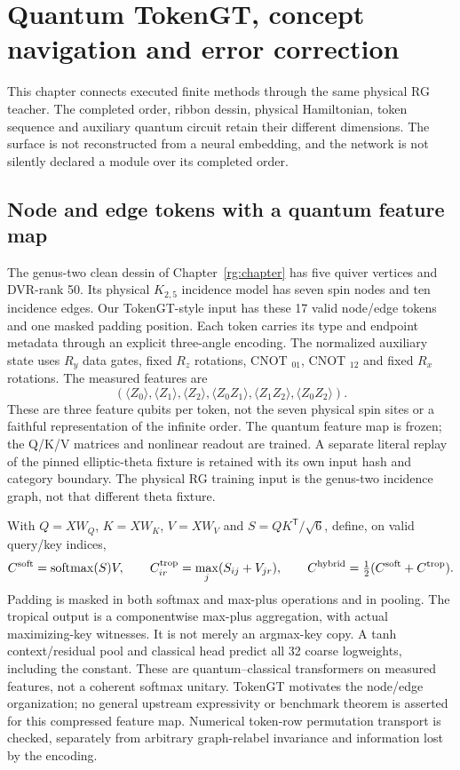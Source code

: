 \documentclass[11pt,oneside,openany]{book}
\theoremstyle{definition}\newtheorem{definition}[theorem]{Definition}
\theoremstyle{remark}\newtheorem{remark}[theorem]{Remark}
\begin{document}
\chapter{Quantum TokenGT, concept navigation and error correction}
\label{qtoken:chapter}
This chapter connects executed finite methods through the same physical RG
teacher. The completed order, ribbon dessin, physical Hamiltonian, token
sequence and auxiliary quantum circuit retain their different dimensions.
The surface is not reconstructed from a neural embedding, and the network
is not silently declared a module over its completed order.

\section{Node and edge tokens with a quantum feature map}
The genus-two clean dessin of Chapter~\ref{rg:chapter} has five quiver
vertices and DVR-rank 50. Its physical $ K_{2,5}$ incidence model has seven
spin nodes and ten incidence edges. Our TokenGT-style input has these 17
valid node/edge tokens and one masked padding position. Each token carries
its type and endpoint metadata through an explicit three-angle encoding.
The normalized auxiliary state uses $ R_y $ data gates, fixed $ R_z $ rotations,
CNOT $_{01}$, CNOT $_{12}$ and fixed $ R_x $ rotations. The measured features are
\[
 (\langle Z_0\rangle,\langle Z_1\rangle,\langle Z_2\rangle,
   \langle Z_0 Z_1\rangle,\langle Z_1 Z_2\rangle,\langle Z_0 Z_2\rangle).
\]
These are three feature qubits per token, not the seven physical spin sites
or a faithful representation of the infinite order. The quantum feature map
is frozen; the Q/K/V matrices and nonlinear readout are trained. A separate
literal replay of the pinned elliptic-theta fixture is retained with its
own input hash and category boundary. The physical RG training input is the
genus-two incidence graph, not that different theta fixture.

With $ Q=XW_Q $, $ K=XW_K $, $ V=XW_V $ and $ S=QK^{\mathsf{T}}/\sqrt{6}$, define,
on valid query/key indices,
\[
 C^{\rm soft}=\operatorname{softmax}(S)V,
 \qquad C^{\rm trop}_{ir}=\max_j(S_{ij}+V_{jr}),
 \qquad C^{\rm hybrid}=\tfrac 12(C^{\rm soft}+C^{\rm trop}).
\]
Padding is masked in both softmax and max-plus operations and in pooling.
The tropical output is a componentwise max-plus aggregation, with actual
maximizing-key witnesses. It is not merely an argmax-key copy. A tanh
context/residual pool and classical head predict all 32 coarse logweights,
including the constant. These are quantum--classical transformers on measured
features, not a coherent softmax unitary. TokenGT \cite{QTokenGT} motivates
the node/edge organization; no general upstream expressivity or benchmark
theorem is asserted for this compressed feature map. Numerical token-row
permutation transport is checked, separately from arbitrary graph-relabel
invariance and information lost by the encoding.
\end{document}
